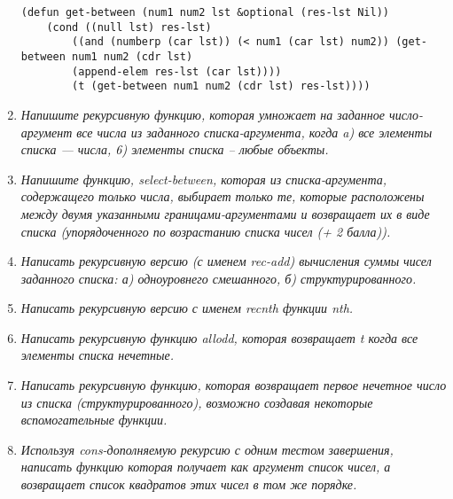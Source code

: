 \begin{enumerate}[wide=0pt]
\begin{lstlisting}
(defun get-between (num1 num2 lst &optional (res-lst Nil))
	(cond ((null lst) res-lst)
		((and (numberp (car lst)) (< num1 (car lst) num2)) (get-between num1 num2 (cdr lst) 
		(append-elem res-lst (car lst))))
        (t (get-between num1 num2 (cdr lst) res-lst))))
	\end{lstlisting}
	\item \textit{Напишите рекурсивную функцию, которая умножает на заданное число-аргумент все числа из заданного списка-аргумента, когда 
		a) все элементы списка --- числа,
		6) элементы списка -- любые объекты.}
	
	\item \textit{Напишите функцию, select-between, которая из списка-аргумента, содержащего только числа, выбирает только те, которые расположены между двумя указанными границами-аргументами и возвращает их в виде списка (упорядоченного по возрастанию списка чисел (+ 2 балла)).}
	
	\item \textit{Написать рекурсивную версию (с именем rec-add) вычисления суммы чисел заданного списка: а) одноуровнего смешанного, б) структурированного.}
	
	\item \textit{Написать рекурсивную версию с именем recnth функции nth.}
	
	\item \textit{Написать рекурсивную функцию allodd, которая возвращает t когда все элементы списка нечетные.}
	
	\item \textit{Написать рекурсивную функцию, которая возвращает первое нечетное число из списка (структурированного), возможно создавая некоторые вспомогательные функции.}
	
	\item \textit{Используя cons-дополняемую рекурсию с одним тестом завершения, написать функцию которая получает как аргумент список чисел, а возвращает список квадратов этих чисел в том же порядке.}
	
\end{enumerate}